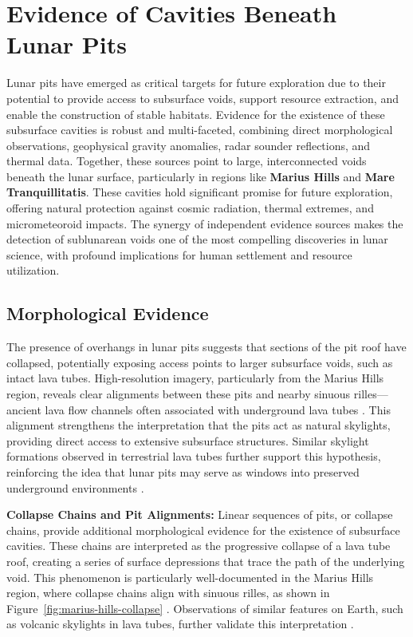 \graphicspath{{img/ch4}}

\section{Evidence of Cavities Beneath Lunar Pits}

Lunar pits have emerged as critical targets for future exploration due to their potential to provide access to subsurface voids, support resource extraction, and enable the construction of stable habitats. Evidence for the existence of these subsurface cavities is robust and multi-faceted, combining direct morphological observations, geophysical gravity anomalies, radar sounder reflections, and thermal data. Together, these sources point to large, interconnected voids beneath the lunar surface, particularly in regions like \textbf{Marius Hills} and \textbf{Mare Tranquillitatis}. These cavities hold significant promise for future exploration, offering natural protection against cosmic radiation, thermal extremes, and micrometeoroid impacts. The synergy of independent evidence sources makes the detection of sublunarean voids one of the most compelling discoveries in lunar science, with profound implications for human settlement and resource utilization.

\subsection{Morphological Evidence}

The presence of overhangs in lunar pits suggests that sections of the pit roof have collapsed, potentially exposing access points to larger subsurface voids, such as intact lava tubes. High-resolution imagery, particularly from the Marius Hills region, reveals clear alignments between these pits and nearby sinuous rilles—ancient lava flow channels often associated with underground lava tubes \citep{grails-gradients-mariushills, cavities-selene-lavatubes}. This alignment strengthens the interpretation that the pits act as natural skylights, providing direct access to extensive subsurface structures. Similar skylight formations observed in terrestrial lava tubes further support this hypothesis, reinforcing the idea that lunar pits may serve as windows into preserved underground environments \citep{lunar-pits-entrances-to-caves, new-wagner}.

\textbf{Collapse Chains and Pit Alignments:} Linear sequences of pits, or collapse chains, provide additional morphological evidence for the existence of subsurface cavities. These chains are interpreted as the progressive collapse of a lava tube roof, creating a series of surface depressions that trace the path of the underlying void. This phenomenon is particularly well-documented in the Marius Hills region, where collapse chains align with sinuous rilles, as shown in Figure~\ref{fig:marius-hills-collapse} \citep{grails-gradients-mariushills, cavities-selene-lavatubes}. Observations of similar features on Earth, such as volcanic skylights in lava tubes, further validate this interpretation \citep{new-wagner}.

